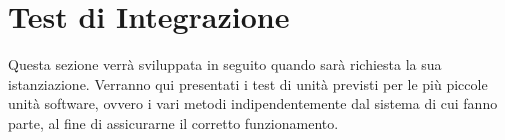 \documentclass[PianoDiQualifica.tex]{subfiles}
\begin{document}
\chapter{Test di Integrazione}
Questa sezione verrà sviluppata in seguito quando sarà richiesta la sua istanziazione.
Verranno qui presentati i test di unità previsti per le più piccole unità software, ovvero i vari metodi indipendentemente dal sistema di cui fanno parte, al fine di assicurarne il corretto funzionamento.
\end{document}
